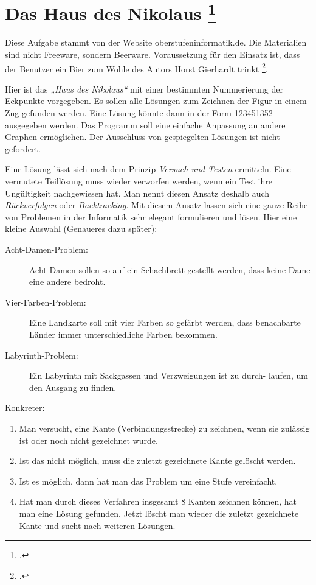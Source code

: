 \documentclass{lehramt-informatik-aufgabe}
\begin{document}

\section{Das Haus des Nikolaus
\footcite[Seite 2-3]{aud:ab:3}
}

\begin{liExkurs}[Quelle]
Diese Aufgabe stammt von der Website oberstufeninformatik.de. Die
Materialien sind nicht Freeware, sondern Beerware. Voraussetzung für
den Einsatz ist, dass der Benutzer ein Bier zum Wohle des Autors Horst
Gierhardt trinkt \footcite{net:pdf:nikolaus}.
\end{liExkurs}

\noindent
Hier ist das \emph{„Haus des Nikolaus“} mit einer bestimmten
Nummerierung der Eckpunkte vorgegeben. Es sollen alle Lösungen zum
Zeichnen der Figur in einem Zug gefunden werden. Eine Lösung könnte dann
in der Form 123451352 ausgegeben werden. Das Programm soll eine einfache
Anpassung an andere Graphen ermöglichen. Der Ausschluss von gespiegelten
Lösungen ist nicht gefordert.

Eine Lösung lässt sich nach dem Prinzip \emph{Versuch und Testen}
ermitteln. Eine vermutete Teillösung muss wieder verworfen werden, wenn
ein Test ihre Ungültigkeit nachgewiesen hat. Man nennt diesen Ansatz
deshalb auch \emph{Rückverfolgen} oder \emph{Backtracking}. Mit diesem
Ansatz lassen sich eine ganze Reihe von Problemen in der Informatik sehr
elegant formulieren und lösen. Hier eine kleine Auswahl (Genaueres dazu
später):

\begin{description}
\item[Acht-Damen-Problem:] Acht Damen sollen so auf ein Schachbrett
gestellt werden, dass keine Dame eine andere bedroht.

\item[Vier-Farben-Problem:] Eine Landkarte soll mit vier Farben so
gefärbt werden, dass benachbarte Länder immer unterschiedliche Farben
bekommen.

\item[Labyrinth-Problem:] Ein Labyrinth mit Sackgassen und Verzweigungen
ist zu durch- laufen, um den Ausgang zu finden.
\end{description}

\noindent
Konkreter:

\begin{enumerate}
\item Man versucht, eine Kante (Verbindungsstrecke) zu zeichnen, wenn
sie zulässig ist oder noch nicht gezeichnet wurde.

\item Ist das nicht möglich, muss die zuletzt gezeichnete Kante gelöscht
werden.

\item  Ist es möglich, dann hat man das Problem um eine Stufe
vereinfacht.

\item  Hat man durch dieses Verfahren insgesamt 8 Kanten zeichnen
können, hat man eine Lösung gefunden. Jetzt löscht man wieder die
zuletzt gezeichnete Kante und sucht nach weiteren Lösungen.
\end{enumerate}
\end{document}
